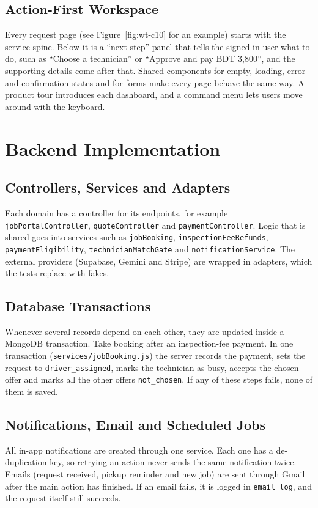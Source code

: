\documentclass{standalone}
\begin{document}
\subsection{Action-First Workspace}
Every request page (see Figure~\ref{fig:wt-c10} for an example) starts with the service spine. Below it is a ``next step'' panel that tells the signed-in user what to do, such as ``Choose a technician'' or ``Approve and pay BDT 3,800'', and the supporting details come after that. Shared components for empty, loading, error and confirmation states and for forms make every page behave the same way. A product tour introduces each dashboard, and a command menu lets users move around with the keyboard.

\section{Backend Implementation}
\subsection{Controllers, Services and Adapters}
Each domain has a controller for its endpoints, for example \texttt{jobPortalController}, \texttt{quoteController} and \texttt{paymentController}. Logic that is shared goes into services such as \texttt{jobBooking}, \texttt{inspectionFeeRefunds}, \texttt{paymentEligibility}, \texttt{technicianMatchGate} and \texttt{notificationService}. The external providers (Supabase, Gemini and Stripe) are wrapped in adapters, which the tests replace with fakes.

\subsection{Database Transactions}
Whenever several records depend on each other, they are updated inside a MongoDB transaction. Take booking after an inspection-fee payment. In one transaction (\texttt{services/\allowbreak jobBooking.js}) the server records the payment, sets the request to \texttt{driver\_assigned}, marks the technician as busy, accepts the chosen offer and marks all the other offers \texttt{not\_chosen}. If any of these steps fails, none of them is saved.

\subsection{Notifications, Email and Scheduled Jobs}
All in-app notifications are created through one service. Each one has a de-duplication key, so retrying an action never sends the same notification twice. Emails (request received, pickup reminder and new job) are sent through Gmail after the main action has finished. If an email fails, it is logged in \texttt{email\_log}, and the request itself still succeeds.
\end{document}
